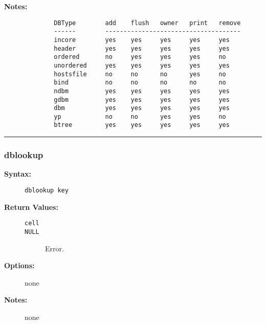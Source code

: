 \begin{description}
\begin{description}
\end{description}


\item[{\bf Notes:}] \mbox{}

\begin{verbatim}
        DBType        add    flush   owner   print   remove
        ------        -------------------------------------
        incore        yes    yes     yes     yes     yes
        header        yes    yes     yes     yes     yes
        ordered       no     yes     yes     yes     no
        unordered     yes    yes     yes     yes     yes
        hostsfile     no     no      no      yes     no
        bind          no     no      no      no      no
        ndbm          yes    yes     yes     yes     yes
        gdbm          yes    yes     yes     yes     yes
        dbm           yes    yes     yes     yes     yes
        yp            no     no      yes     yes     no
        btree         yes    yes     yes     yes     yes
\end{verbatim}


\end{description}


\hrule
\subsubsection{dblookup}

\begin{description}
\item[{\bf Syntax:}] \mbox{}

{\tt dblookup key}

\item[{\bf Return Values:}] \mbox{}

\begin{description}
\item[{\tt cell}] \mbox{}



\item[{\tt NULL}] \mbox{}

Error.  

\end{description}


\item[{\bf Options:}] \mbox{}

none

\item[{\bf Notes:}] \mbox{}

none

\end{description}


